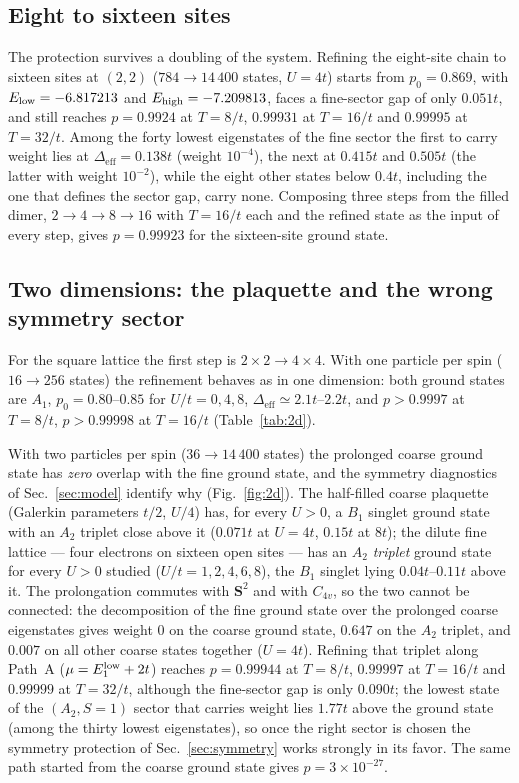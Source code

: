 \documentclass[
  aps,
  prc,
  reprint,
  superscriptaddress,
  floatfix,
  nofootinbib
]{revtex4-2}
\newcommand{\Deff}{\Delta_{\mathrm{eff}}}
\begin{document}
\subsection{Eight to sixteen sites}
\label{sec:chain816}
The protection survives a doubling of the system.  Refining the eight-site
chain to sixteen sites at $(2,2)$ ($784\to14\,400$ states, $U=4t$) starts
from $p_0=0.869$, with $E_{\rm low}=-6.817213$ and $E_{\rm high}=-7.209813$,
faces a fine-sector gap of only $0.051t$, and still reaches $p=0.9924$ at
$T=8/t$, $0.99931$ at $T=16/t$ and $0.99995$ at $T=32/t$.  Among the forty
lowest eigenstates of the fine sector the first to carry weight lies at
$\Deff=0.138t$ (weight $10^{-4}$), the next at $0.415t$ and $0.505t$ (the
latter with weight $10^{-2}$), while the eight other states below $0.4t$,
including the one that defines the sector gap, carry none.  Composing three steps from the filled dimer,
$2\to4\to8\to16$ with $T=16/t$ each and the refined state as the input of
every step, gives $p=0.99923$ for the sixteen-site ground state.

\subsection{Two dimensions: the plaquette and the wrong symmetry sector}
\label{sec:2d}
For the square lattice the first step is $2\times2\to4\times4$.  With one
particle per spin ($16\to256$ states) the refinement behaves as in one
dimension: both ground states are $A_1$, $p_0=0.80$--$0.85$ for $U/t=0,4,8$,
$\Deff\simeq2.1t$--$2.2t$, and $p>0.9997$ at $T=8/t$, $p>0.99998$ at
$T=16/t$ (Table~\ref{tab:2d}).

With two particles per spin ($36\to14\,400$ states) the prolonged coarse
ground state has \emph{zero} overlap with the fine ground state, and the
symmetry diagnostics of Sec.~\ref{sec:model} identify why
(Fig.~\ref{fig:2d}).  The half-filled coarse plaquette (Galerkin parameters
$t/2$, $U/4$) has, for every $U>0$, a $B_1$ singlet ground state with an
$A_2$ triplet close above it ($0.071t$ at $U=4t$, $0.15t$ at $8t$); the
dilute fine lattice --- four electrons on sixteen open sites --- has an
$A_2$ \emph{triplet} ground state for every $U>0$ studied
($U/t=1,2,4,6,8$), the $B_1$ singlet lying $0.04t$--$0.11t$ above it.  The
prolongation commutes with $\mathbf S^2$ and with $C_{4v}$, so the two cannot
be connected: the decomposition of the fine ground state over the prolonged
coarse eigenstates gives weight $0$ on the coarse ground state, $0.647$ on
the $A_2$ triplet, and $0.007$ on all other coarse states together ($U=4t$).
Refining that triplet along Path~A ($\mu=E_1^{\rm low}+2t$) reaches
$p=0.99944$ at $T=8/t$, $0.99997$ at $T=16/t$ and $0.99999$ at $T=32/t$,
although the fine-sector gap is only $0.090t$; the lowest state of the
$(A_2,S=1)$ sector that carries weight lies $1.77t$ above the ground state
(among the thirty lowest eigenstates), so once the right sector is chosen
the symmetry protection of Sec.~\ref{sec:symmetry} works strongly in its
favor.  The same path started from the coarse ground state gives
$p=3\times10^{-27}$.
\end{document}
